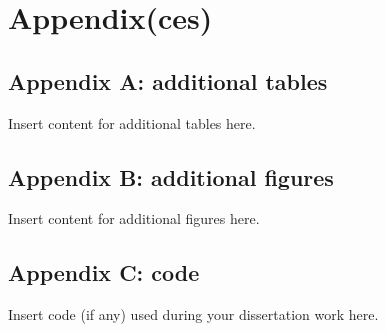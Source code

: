 \documentclass[
  11pt,
]{article}
\begin{document}
\newpage



\newpage

\hypertarget{appendixces}{%
\section{Appendix(ces)}\label{appendixces}}

\hypertarget{appendix-a-additional-tables}{%
\subsection{Appendix A: additional
tables}\label{appendix-a-additional-tables}}

Insert content for additional tables here.

\newpage

\hypertarget{appendix-b-additional-figures}{%
\subsection{Appendix B: additional
figures}\label{appendix-b-additional-figures}}

Insert content for additional figures here.

\newpage

\hypertarget{appendix-c-code}{%
\subsection{Appendix C: code}\label{appendix-c-code}}

Insert code (if any) used during your dissertation work here.
\end{document}
